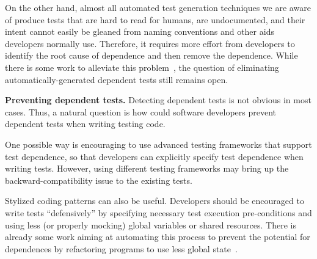 On the other hand, 
almost all automated test generation
techniques we are aware of produce tests
that are hard to read for humans, are undocumented, and their intent
cannot easily be gleaned from naming conventions and other aids
developers normally use. Therefore, it requires more effort
from developers to identify the root cause of dependence
and then remove the dependence. While there is some work to alleviate
this problem~\cite{fraseretal:ISSTA:2011}, the question
of eliminating  automatically-generated dependent tests
still remains open.




\tinyrelax

\noindent \textbf{{Preventing dependent tests.}}
Detecting dependent tests is not obvious in most
cases. Thus, a natural question is how could
software developers prevent dependent tests when
writing testing code.

One possible way is encouraging to
use advanced testing frameworks that support test dependence,
so that developers can explicitly specify test
dependence when writing tests.
However, using different testing frameworks may
bring up the backward-compatibility issue to the existing tests.

Stylized coding patterns can also be useful. Developers
should be encouraged to write tests ``defensively'' by
specifying necessary test execution pre-conditions and
using less (or properly mocking) global variables or shared resources. 
There is already some work aiming at automating this
process to prevent the potential
for dependences by refactoring programs to use
less global state~\cite{wlokaetal:FSE:2009}. 




